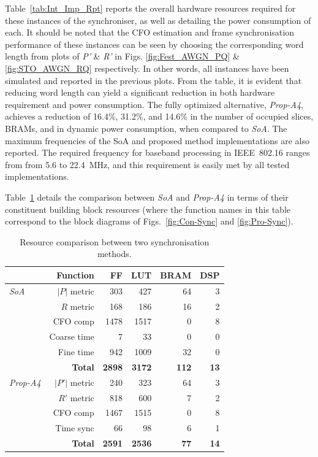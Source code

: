 Table~\ref{tab:Int_Imp_Rpt} reports the overall hardware resources required for these instances of the synchroniser, as well as detailing the power consumption of each.
It should be noted that the CFO estimation and frame synchronisation performance of these instances can be seen by choosing the corresponding word length from plots of \emph{P'} \& \emph{R'} in Figs. \ref{fig:Fest_AWGN_PQ} \& \ref{fig:STO_AWGN_RQ} respectively. In other words, all instances have been simulated and reported in the previous plots.
From the table, it is evident that reducing word length can yield a significant reduction in both hardware requirement and power consumption.
The fully optimized alternative, \textit{Prop-A4}, achieves a reduction of 16.4\%, 31.2\%, and 14.6\% in the number of occupied slices, BRAMs, and in dynamic power consumption, when compared to \textit{SoA}.
The maximum frequencies of the SoA and proposed method implementations are also reported.
The required frequency for baseband processing in IEEE~802.16 ranges from from 5.6 to 22.4~MHz, and this requirement is easily met by all tested implementations.

Table~\ref{tab:Imp_Rpt} details the comparison between \textit{SoA} and \textit{Prop-A4} in terms of their constituent building block resources (where the function names in this table correspond to the block diagrams of Figs.~\ref{fig:Con-Sync} and \ref{fig:Pro-Sync}).

\begin{table}[h]
	\centering
	\caption{ Resource comparison between two synchronisation methods.}
	\label{tab:Imp_Rpt}
	\begin{tabular}{l|r|r|r|r|r}
       \hline \hline
    		  \multicolumn{2}{r|}{Function}			& {FF} & {LUT} & {BRAM} & {DSP} \\
    	\hline
		\textit{SoA}		&  $|P|$ metric		& 303 	& 427 	& 64 	& 3 	\\
						&  $R$ metric		& 168 	& 186 	& 16 	& 2	\\
						&  CFO comp		& 1478 	& 1517 	& 0	 	& 8	\\
						& Coarse time		& 7  	& 33  	& 0	 	& 0	\\
    						& Fine time			& 942  	& 1009  	& 32 	& 0	\\
						& \textbf{Total} & \textbf{2898} & \textbf{3172} & \textbf{112} & \textbf{13}\\
	\hline
		\textit{Prop-A4}	& $|P'|$ metric		& 240 	& 323 	& 64 	& 3 \\
						& $R'$ metric		& 818 	& 600 	& 7		& 2 \\
						& CFO comp		& 1467 	& 1515 	& 0 		& 8 \\
						& Time sync			& 66	& 98	& 6 		& 1 \\
						& \textbf{Total} & \textbf{2591} & \textbf{2536} & \textbf{77} & \textbf{14}\\
    	\hline \hline
    \end{tabular}
\end{table}

